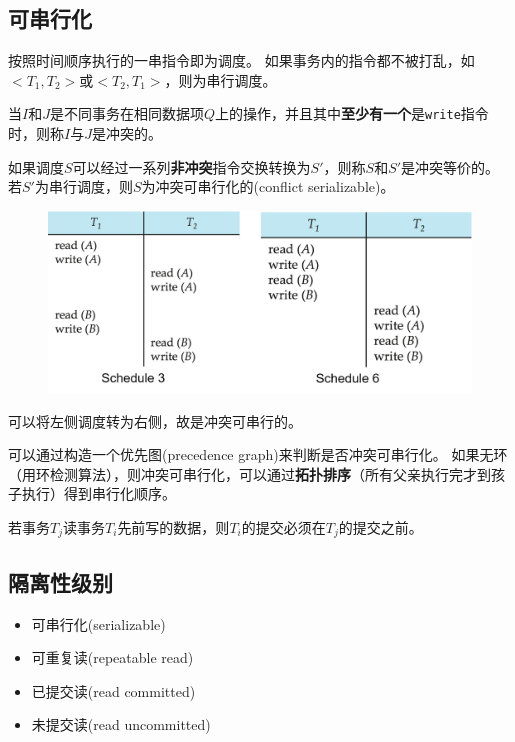 \subsection{可串行化}
\begin{definition}[调度]
按照时间顺序执行的一串指令即为调度。
如果事务内的指令都不被打乱，如$<T_1,T_2>$或$<T_2,T_1>$，则为串行调度。
\end{definition}
\begin{definition}[冲突]
当$I$和$J$是不同事务在相同数据项$Q$上的操作，并且其中\textbf{至少有一个}是\verb'write'指令时，则称$I$与$J$是冲突的。
\end{definition}
\begin{definition}
如果调度$S$可以经过一系列\textbf{非冲突}指令交换转换为$S'$，则称$S$和$S'$是冲突等价的。
若$S'$为串行调度，则$S$为冲突可串行化的(conflict serializable)。
\end{definition}
\begin{figure}[H]
\centering
\includegraphics[width=0.8\linewidth]{fig/conflict_serializability.png}
\end{figure}
可以将左侧调度转为右侧，故是冲突可串行的。

可以通过构造一个优先图(precedence graph)来判断是否冲突可串行化。
如果无环（用环检测算法），则冲突可串行化，可以通过\textbf{拓扑排序}（所有父亲执行完才到孩子执行）得到串行化顺序。

\begin{definition}[可恢复调度]
若事务$T_j$读事务$T_i$先前写的数据，则$T_i$的提交必须在$T_j$的提交之前。
\end{definition}

\subsection{隔离性级别}
\begin{itemize}
	\item 可串行化(serializable)
	\item 可重复读(repeatable read)
	\item 已提交读(read committed)
	\item 未提交读(read uncommitted)
\end{itemize}